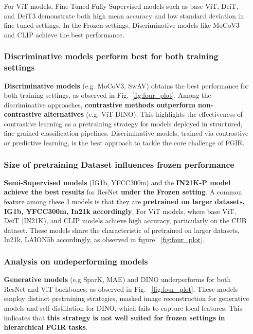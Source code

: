 \documentclass[10pt,twocolumn]{article}
\begin{document}
For ViT models, Fine-Tuned Fully Supervised models such as
base ViT, DeiT, and DeiT3 demonstrate both high mean accuracy and
low standard deviation in fine-tuned settings. In the Frozen settings, Discriminative models like MoCoV3 and CLIP achieve the best performance.

\vspace{-0.2cm}
\subsubsection{Discriminative models perform best for both training settings}
\textbf{Discriminative models} (e.g. MoCoV3, SwAV) obtains the best performance for both training settings, as observed in Fig.~\ref{fig:four_plot}. Among the discriminative approaches, \textbf{contrastive methods outperform non-contrastive alternatives} (e.g. ViT DINO). This highlights the effectiveness of contrastive learning as a pretraining strategy for models deployed in structured, fine-grained classification pipelines. Discriminative models, trained via contrastive or predictive learning, is the best approach to tackle the core challenge of FGIR.

\vspace{-0.2cm}
\subsubsection{Size of pretraining Dataset influences frozen performance}
\textbf{Semi-Supervised models} (IG1b, YFCC300m) and the \textbf{IN21K-P model achieve the best results} for ResNet \textbf{under the Frozen setting}. A common feature among these 3 models is that they are \textbf{pretrained on larger datasets, IG1b, YFCC300m, In21k accordingly}. For ViT models, where base ViT, DeiT (IN21K), and CLIP models achieve high accuracy, particularly on the CUB dataset. These models share the characteristic of pretrained on larger datasets, In21k, LAION5b accordingly, as observed in figure ~\ref{fig:four_plot}.

\vspace{-0.2cm}
\subsubsection{Analysis on undeperforming models}
\textbf{Generative models} (e.g SparK, MAE) and DINO underperforms for both ResNet and ViT backbones, as observed in Fig. ~\ref{fig:four_plot}. These models employ distinct pretraining strategies, masked image reconstruction for generative models and self-distillation for DINO, which fails to capture local features. This indicates that \textbf{this strategy is not well suited for frozen settings in hierarchical FGIR tasks}.
\end{document}
